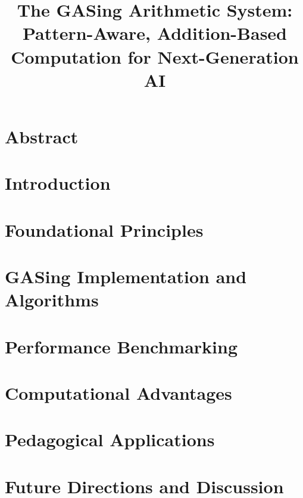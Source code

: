 \documentclass[10pt,twocolumn]{article}
\begin{document}
\title{The GASing Arithmetic System: Pattern-Aware, Addition-Based Computation for Next-Generation AI}



\maketitle

\pagestyle{plain}

\section*{Abstract}


\section{Introduction}


\section{Foundational Principles}


\section{GASing Implementation and Algorithms}


\section{Performance Benchmarking}


\section{Computational Advantages}


\section{Pedagogical Applications}


\section{Future Directions and Discussion}

\end{document}
